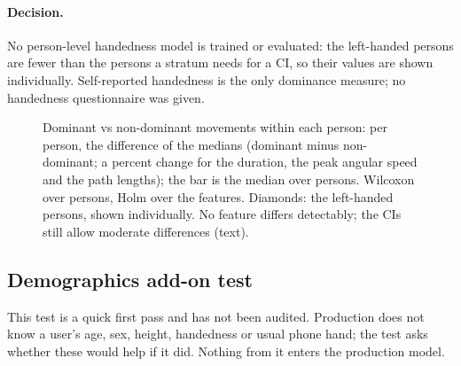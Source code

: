 \paragraph{Decision.} No person-level handedness model is trained or evaluated: the  left-handed
persons are fewer than the  persons a stratum needs for a CI, so their values are shown
individually. Self-reported handedness is the only dominance measure; no handedness questionnaire was given.

\begin{figure}[tbp]
\centering
{}
\caption{Dominant vs non-dominant movements within each person: per person, the difference of the medians
(dominant minus non-dominant; a percent change for the duration, the peak angular speed and the path lengths);
the bar is the median over persons. Wilcoxon over persons, Holm over the  features. Diamonds:
the  left-handed persons, shown individually. No feature differs detectably; the CIs still allow
moderate differences (text).}
\label{fig:SEC_07_dominance_paired}\label{fig:app:sec-dominance-paired}
\end{figure}


\FloatBarrier
\subsection{Demographics add-on test}\label{app:sec:demo}

This test is a quick first pass and has not been audited. Production does not know a user's age, sex, height,
handedness or usual phone hand; the test asks whether these would help if it did. Nothing from it enters the
production model.

